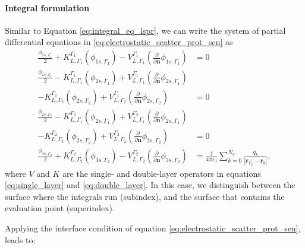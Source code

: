 \paragraph{Integral formulation}

Similar to Equation \eqref{eq:integral_eq_lspr}, we can write the system of partial differential equations in \eqref{eq:electrostatic_scatter_prot_sen} as
%
\begin{align} \label{eq:integral_eq_lspr_nobc_system}
\frac{\phi_{1s,\Gamma_1}}{2}+ K_{L,\Gamma_1}^{\Gamma_1}(\phi_{1s,\Gamma_1}) - V_{L,\Gamma_1}^{\Gamma_1} \left(\frac{\partial}{\partial \mathbf{n}}\phi_{1s,\Gamma_1} \right) &= 0  \nonumber \\
\frac{\phi_{2s,\Gamma_1}}{2} - K_{L,\Gamma_1}^{\Gamma_1}(\phi_{2s,\Gamma_1}) + V_{L,\Gamma_1}^{\Gamma_1} \left(\frac{\partial}{\partial \mathbf{n}}\phi_{2s,\Gamma_1} \right) \nonumber\\
 - K_{L,\Gamma_2}^{\Gamma_1}(\phi_{2s,\Gamma_2}) + V_{L,\Gamma_2}^{\Gamma_1} \left(\frac{\partial}{\partial \mathbf{n}}\phi_{2s,\Gamma_2} \right) &= 0  \nonumber \\
\frac{\phi_{2s,\Gamma_2}}{2} - K_{L,\Gamma_1}^{\Gamma_2}(\phi_{2s,\Gamma_1}) + V_{L,\Gamma_1}^{\Gamma_2} \left(\frac{\partial}{\partial \mathbf{n}}\phi_{2s,\Gamma_1} \right) \nonumber \\ 
- K_{L,\Gamma_2}^{\Gamma_2}(\phi_{2s,\Gamma_2}) + V_{L,\Gamma_2}^{\Gamma_2} \left(\frac{\partial}{\partial \mathbf{n}}\phi_{2s,\Gamma_2} \right) &= 0  \nonumber \\
\frac{\phi_{3s,\Gamma_2}}{2} + K_{L,\Gamma_2}^{\Gamma_2}(\phi_{3s,\Gamma_2}) - V_{L,\Gamma_2}^{\Gamma_2} \left( \frac{\partial}{\partial \mathbf{n}} \phi_{3s,\Gamma_2} \right) &= \frac{1}{4\pi\epsilon_3} \sum_{k=0}^{N_q} \frac{q_k}{|\mathbf{r}_{\Gamma_2} - \mathbf{r}_k|} ,
\end{align}
%
\noindent where $V$ and $K$ are the single- and double-layer operators in equations 
\eqref{eq:single_layer} and \eqref{eq:double_layer}. In this case, we distinguish between the
surface where the integrals run (subindex), and the surface that contains the evaluation point (superindex).

Applying the interface condition of equation \eqref{eq:electrostatic_scatter_prot_sen},
leads to: 


